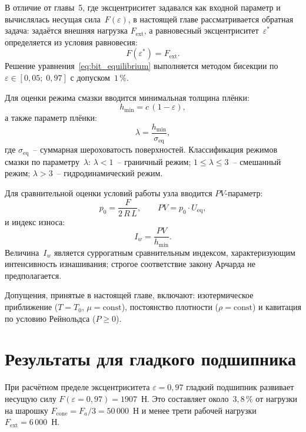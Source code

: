 В отличие от главы~5, где эксцентриситет задавался как входной
параметр и вычислялась несущая сила~$F(\varepsilon)$, в настоящей
главе рассматривается обратная задача: задаётся внешняя нагрузка
$F_{\mathrm{ext}}$, а равновесный эксцентриситет~$\varepsilon^*$
определяется из условия равновесия:
\begin{equation}
  F(\varepsilon^*) = F_{\mathrm{ext}}.
  \label{eq:bit_equilibrium}
\end{equation}
Решение уравнения~\eqref{eq:bit_equilibrium} выполняется методом
бисекции по~$\varepsilon \in [0{,}05;\; 0{,}97]$ с допуском~$1\,\%$.

Для оценки режима смазки вводится минимальная толщина плёнки:
\begin{equation}
  h_{\min} = c\,(1 - \varepsilon),
  \label{eq:bit_hmin}
\end{equation}
а также параметр плёнки:
\begin{equation}
  \lambda = \frac{h_{\min}}{\sigma_{\mathrm{eq}}},
  \label{eq:bit_lambda}
\end{equation}
где $\sigma_{\mathrm{eq}}$~-- суммарная шероховатость поверхностей.
Классификация режимов смазки по параметру~$\lambda$:
$\lambda < 1$~-- граничный режим;
$1 \leq \lambda \leq 3$~-- смешанный режим;
$\lambda > 3$~-- гидродинамический режим.

Для сравнительной оценки условий работы узла вводится
$PV$-параметр:
\begin{equation}
  p_0 = \frac{F}{2\,R\,L}, \qquad
  PV = p_0 \cdot U_{\mathrm{eq}},
  \label{eq:bit_PV}
\end{equation}
и индекс износа:
\begin{equation}
  I_w = \frac{PV}{h_{\min}}.
  \label{eq:bit_Iw}
\end{equation}
Величина~$I_w$ является суррогатным сравнительным
индексом, характеризующим интенсивность изнашивания; строгое
соответствие закону Арчарда не предполагается.

Допущения, принятые в настоящей главе, включают: изотермическое
приближение ($T = T_0$, $\mu = \mathrm{const}$), постоянство
плотности ($\rho = \mathrm{const}$) и кавитация по условию
Рейнольдса ($P \geq 0$).


\section{Результаты для гладкого подшипника}

При расчётном пределе эксцентриситета $\varepsilon = 0{,}97$
гладкий подшипник развивает несущую силу
$F(\varepsilon = 0{,}97) = 1907$~Н. Это составляет около~$3{,}8\,\%$
от нагрузки на шарошку $F_{\mathrm{cone}} = F_a / 3 = 50\,000$~Н
и менее трети рабочей нагрузки $F_{\mathrm{ext}} = 6\,000$~Н.

